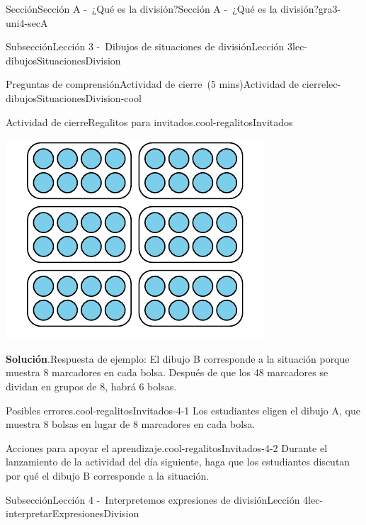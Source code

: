 \documentclass[oneside,10pt,]{article}
\newcommand{\blocktitlefont}{\relax}
\begin{document}
\begin{sectionptx}{Sección}{Sección A -~¿Qué es la división?}{}{Sección A -~¿Qué es la división?}{}{}{gra3-uni4-secA}
\begin{subsectionptx}{Subsección}{Lección 3 -~Dibujos de situaciones de división}{}{Lección 3}{}{}{lec-dibujosSituacionesDivision}
\begin{reading-questions-subsubsection}{Preguntas de comprensión}{Actividad de cierre~(5 mins)}{}{Actividad de cierre}{}{}{lec-dibujosSituacionesDivision-cool}
\begin{project}{Actividad de cierre}{Regalitos para invitados.}{cool-regalitosInvitados}
\begin{sidebyside}{2}{0}{0}{0}
\begin{sbspanel}{0.5}
\includegraphics[width=\linewidth]{external/svg-source/tikz-file-246307.pdf}
\end{sbspanel}%
\end{sidebyside}%
\par\smallskip%
\noindent\textbf{\blocktitlefont Solución}.\hypertarget{cool-regalitosInvitados-3}{}\quad{}Respuesta de ejemplo: El dibujo B corresponde a la situación porque muestra 8 marcadores en cada bolsa. Después de que los 48 marcadores se dividan en grupos de 8, habrá 6 bolsas.%
\end{project}%
\par
\begin{paragraphs}{Posibles errores.}{cool-regalitosInvitados-4-1}%
Los estudiantes eligen el dibujo A, que muestra 8 bolsas en lugar de 8 marcadores en cada bolsa.%
\end{paragraphs}%
\begin{paragraphs}{Acciones para apoyar el aprendizaje.}{cool-regalitosInvitados-4-2}%
Durante el lanzamiento de la actividad del día siguiente, haga que los estudiantes discutan por qué el dibujo B corresponde a la situación.%
\end{paragraphs}%
\end{reading-questions-subsubsection}
\end{subsectionptx}
%
%
\typeout{************************************************}
\typeout{************************************************}
%
\begin{subsectionptx}{Subsección}{Lección 4 -~Interpretemos expresiones de división}{}{Lección 4}{}{}{lec-interpretarExpresionesDivision}

\end{subsectionptx}
\end{sectionptx}
\end{document}
